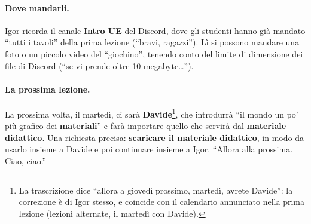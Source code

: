 \paragraph{Dove mandarli.} Igor ricorda il canale \textbf{Intro UE} del Discord, dove
gli studenti hanno già mandato ``tutti i tavoli'' della prima lezione (``bravi,
ragazzi''). Lì si possono mandare una foto o un piccolo video del ``giochino'', tenendo
conto del limite di dimensione dei file di Discord (``se vi prende oltre 10
megabyte\ldots'').

\paragraph{La prossima lezione.} La prossima volta, il martedì, ci sarà
\textbf{Davide}\footnote{La trascrizione dice ``allora a giovedì prossimo, martedì,
avrete Davide'': la correzione è di Igor stesso, e coincide con il calendario annunciato
nella prima lezione (lezioni alternate, il martedì con Davide).}, che introdurrà ``il
mondo un po' più grafico dei \textbf{materiali}'' e farà importare quello che servirà
dal \textbf{materiale didattico}. Una richiesta precisa: \textbf{scaricare il materiale
didattico}, in modo da usarlo insieme a Davide e poi continuare insieme a Igor. ``Allora
alla prossima. Ciao, ciao.''

